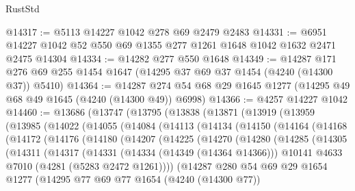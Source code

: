 \begin{lexlean}{RustStd}
\begin{coremodule}
{\begin{coremodule}
{{{{{{{{{{{{{{{{{{{{{{{{{{{{{{{{{{{@14317 := @5113 @14227 @1042 @278 @69 @2479 @2483
@14331 := @6951 @14227 @1042 @52 @550 @69 @1355 @277 @1261 @1648 @1042 @1632 @2471 @2475 @14304
@14334 := @14282 @277 @550 @1648
@14349 := @14287
    @171
    @276
    @69
    @255
    @1454
    @1647
    (@14295 @37 @69 @37 @1454 (@4240 (@14300 @37)) @5410)
@14364 := @14287 @274 @54 @68 @29 @1645 @1277 (@14295 @49 @68 @49 @1645 (@4240 (@14300 @49)) @6998)
@14366 := @4257 @14227 @1042
@14460 := @13686
    (@13747
      (@13795
        (@13838
          (@13871
            (@13919
              (@13959
                (@13985
                  (@14022
                    (@14055
                      (@14084
                        (@14113
                          (@14134
                            (@14150
                              (@14164
                                (@14168
                                  (@14172
                                    (@14176
                                      (@14180
                                        (@14207
                                          (@14225
                                            (@14270
                                              (@14280
                                                (@14285
                                                  (@14305
                                                    (@14311
                                                      (@14317
                                                        (@14331
                                                          (@14334 (@14349 (@14364 @14366)))
                                                          @10141
                                                          @4633
                                                          @7010
                                                          (@4281 (@5283 @2472 @1261))))
                                                      (@14287
                                                        @280
                                                        @54
                                                        @69
                                                        @29
                                                        @1654
                                                        @1277
                                                        (@14295
                                                          @77
                                                          @69
                                                          @77
                                                          @1654
                                                          (@4240 (@14300 @77))
}}}}}}}}}}}}}}}}}}}}}}}}}}}}}}}}}}}
\end{coremodule}}
\end{coremodule}
\end{lexlean}
